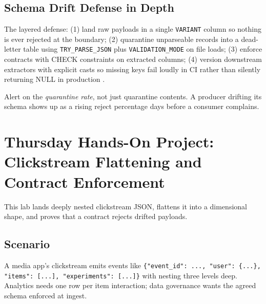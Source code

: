 \subsection{Schema Drift Defense in Depth}
The layered defense: (1) land raw payloads in a single \texttt{VARIANT} column so nothing is ever rejected at the boundary; (2) quarantine unparseable records into a dead-letter table using \texttt{TRY\_PARSE\_JSON} plus \texttt{VALIDATION\_MODE} on file loads; (3) enforce contracts with CHECK constraints on extracted columns; (4) version downstream extractors with explicit casts so missing keys fail loudly in CI rather than silently returning NULL in production \cite{dbtContractsDocs}.

\begin{tipbox}
Alert on the \emph{quarantine rate}, not just quarantine contents. A producer drifting its schema shows up as a rising reject percentage days before a consumer complains.
\end{tipbox}

\section{Thursday Hands-On Project: Clickstream Flattening and Contract Enforcement}
This lab lands deeply nested clickstream JSON, flattens it into a dimensional shape, and proves that a contract rejects drifted payloads.

\subsection*{Scenario}
A media app's clickstream emits events like \texttt{\{"event\_id": ..., "user": \{...\}, "items": [...], "experiments": [...]\}} with nesting three levels deep. Analytics needs one row per item interaction; data governance wants the agreed schema enforced at ingest.


